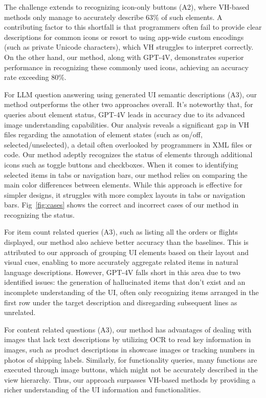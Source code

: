 The challenge extends to recognizing icon-only buttons (A2), where VH-based methods only manage to accurately describe 63\% of such elements. A contributing factor to this shortfall is that programmers often fail to provide clear descriptions for common icons or resort to using app-wide custom encodings (such as private Unicode characters), which VH struggles to interpret correctly. On the other hand, our method, along with GPT-4V, demonstrates superior performance in recognizing these commonly used icons, achieving an accuracy rate exceeding 80\%.

For LLM question answering using generated UI semantic descriptions (A3), our method outperforms the other two approaches overall. It's noteworthy that, for queries about element status, GPT-4V leads in accuracy due to its advanced image understanding capabilities. Our analysis reveals a significant gap in VH files regarding the annotation of element states (such as on/off, selected/unselected), a detail often overlooked by programmers in XML files or code. Our method adeptly recognizes the status of elements through additional icons such as toggle buttons and checkboxes. When it comes to identifying selected items in tabs or navigation bars, our method relies on comparing the main color differences between elements. While this approach is effective for simpler designs, it struggles with more complex layouts in tabs or navigation bars. Fig~\ref{fig:cases} shows the correct and incorrect cases of our method in recognizing the status.

For item count related queries (A3), such as listing all the orders or flights displayed, our method also achieve better accuracy than the baselines. This is attributed to our approach of grouping UI elements based on their layout and visual cues, enabling to more accurately aggregate related items in natural language descriptions. However, GPT-4V falls short in this area due to two identified issues: the generation of hallucinated items that don't exist and an incomplete understanding of the UI, often only recognizing items arranged in the first row under the target description and disregarding subsequent lines as unrelated.

For content related questions (A3), our method has advantages of dealing with images that lack text descriptions by utilizing OCR to read key information in images, such as product descriptions in showcase images or tracking numbers in photos of shipping labels. Similarly, for functionality queries, many functions are executed through image buttons, which might not be accurately described in the view hierarchy. Thus, our approach surpasses VH-based methods by providing a richer understanding of the UI information and functionalities. 

